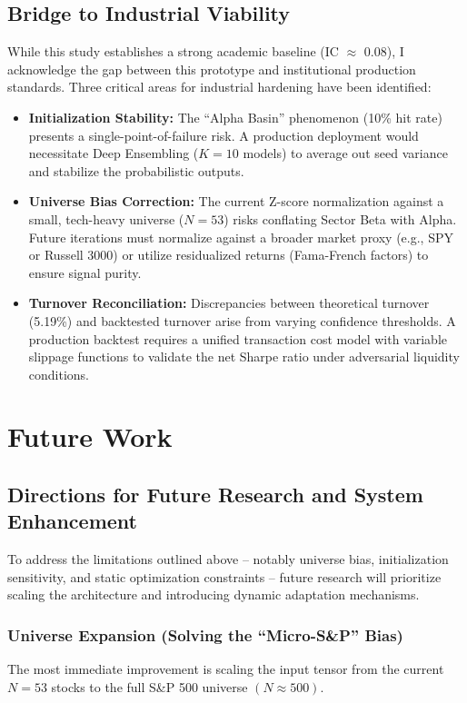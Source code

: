 \documentclass[twoside,final]{hcmut-report}
\begin{document}
\subsection{Bridge to Industrial Viability}
While this study establishes a strong academic baseline (IC $\approx$ 0.08), I acknowledge the gap between this prototype and institutional production standards. Three critical areas for industrial hardening have been identified:

\begin{itemize}
  \item \textbf{Initialization Stability:} The ``Alpha Basin'' phenomenon (10\% hit rate) presents a single-point-of-failure risk. A production deployment would necessitate Deep Ensembling ($K=10$ models) to average out seed variance and stabilize the probabilistic outputs.
  \item \textbf{Universe Bias Correction:} The current Z-score normalization against a small, tech-heavy universe ($N=53$) risks conflating Sector Beta with Alpha. Future iterations must normalize against a broader market proxy (e.g., SPY or Russell 3000) or utilize residualized returns (Fama-French factors) to ensure signal purity.
  \item \textbf{Turnover Reconciliation:} Discrepancies between theoretical turnover (5.19\%) and backtested turnover arise from varying confidence thresholds. A production backtest requires a unified transaction cost model with variable slippage functions to validate the net Sharpe ratio under adversarial liquidity conditions.
\end{itemize}

\section{Future Work}
\subsection{Directions for Future Research and System Enhancement}

To address the limitations outlined above -- notably universe bias, initialization sensitivity, and static optimization constraints -- future research will prioritize scaling the architecture and introducing dynamic adaptation mechanisms.

\subsubsection{Universe Expansion (Solving the ``Micro-S\&P'' Bias)}
The most immediate improvement is scaling the input tensor from the current $N=53$ stocks to the full S\&P 500 universe $(N\approx500)$.
\end{document}
